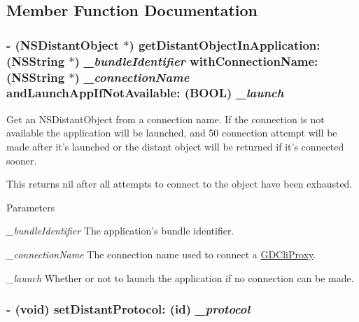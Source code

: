 \subsection{Member Function Documentation}
\hypertarget{interface_g_d_cli_proxy_connector_a4a9943173a516e776d4b8c7dfad1e3df}{
\subsubsection[{getDistantObjectInApplication:withConnectionName:andLaunchAppIfNotAvailable:}]{\setlength{\rightskip}{0pt plus 5cm}-\/ (NSDistantObject $\ast$) getDistantObjectInApplication: ({\bf NSString} $\ast$) {\em \_\-bundleIdentifier}\/ withConnectionName: ({\bf NSString} $\ast$) {\em \_\-connectionName}\/ andLaunchAppIfNotAvailable: (BOOL) {\em \_\-launch}}}
\label{interface_g_d_cli_proxy_connector_a4a9943173a516e776d4b8c7dfad1e3df}


Get an NSDistantObject from a connection name. If the connection is not available the application will be launched, and 50 connection attempt will be made after it's launched or the distant object will be returned if it's connected sooner.

This returns nil after all attempts to connect to the object have been exhausted.


\begin{DoxyParams}{Parameters}
\item[{\em \_\-bundleIdentifier}]The application's bundle identifier. \item[{\em \_\-connectionName}]The connection name used to connect a \hyperlink{interface_g_d_cli_proxy}{GDCliProxy}. \item[{\em \_\-launch}]Whether or not to launch the application if no connection can be made. \end{DoxyParams}
\hypertarget{interface_g_d_cli_proxy_connector_a0c52ccb54528284c3cc164ce5019232a}{
\subsubsection[{setDistantProtocol:}]{\setlength{\rightskip}{0pt plus 5cm}-\/ (void) setDistantProtocol: (id) {\em \_\-protocol}}}
\label{interface_g_d_cli_proxy_connector_a0c52ccb54528284c3cc164ce5019232a}


